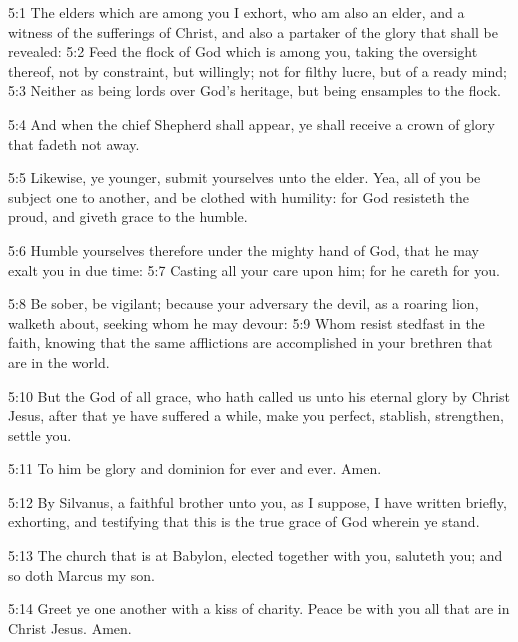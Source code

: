 5:1 The elders which are among you I exhort, who am also an elder, and
a witness of the sufferings of Christ, and also a partaker of the
glory that shall be revealed: 5:2 Feed the flock of God which is among
you, taking the oversight thereof, not by constraint, but willingly;
not for filthy lucre, but of a ready mind; 5:3 Neither as being lords
over God's heritage, but being ensamples to the flock.

5:4 And when the chief Shepherd shall appear, ye shall receive a crown
of glory that fadeth not away.

5:5 Likewise, ye younger, submit yourselves unto the elder. Yea, all
of you be subject one to another, and be clothed with humility: for
God resisteth the proud, and giveth grace to the humble.

5:6 Humble yourselves therefore under the mighty hand of God, that he
may exalt you in due time: 5:7 Casting all your care upon him; for he
careth for you.

5:8 Be sober, be vigilant; because your adversary the devil, as a
roaring lion, walketh about, seeking whom he may devour: 5:9 Whom
resist stedfast in the faith, knowing that the same afflictions are
accomplished in your brethren that are in the world.

5:10 But the God of all grace, who hath called us unto his eternal
glory by Christ Jesus, after that ye have suffered a while, make you
perfect, stablish, strengthen, settle you.

5:11 To him be glory and dominion for ever and ever. Amen.

5:12 By Silvanus, a faithful brother unto you, as I suppose, I have
written briefly, exhorting, and testifying that this is the true grace
of God wherein ye stand.

5:13 The church that is at Babylon, elected together with you,
saluteth you; and so doth Marcus my son.

5:14 Greet ye one another with a kiss of charity. Peace be with you
all that are in Christ Jesus. Amen.

